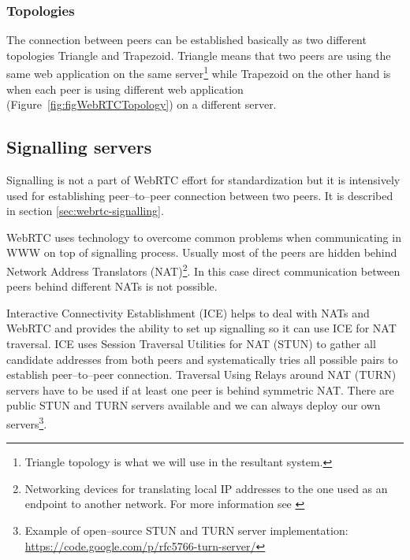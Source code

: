 \subsubsection{Topologies}
The connection between peers can be established basically as two different topologies Triangle and Trapezoid. Triangle means that two peers are using the same web application on the same server\footnote{Triangle topology is what we will use in the resultant system.} while Trapezoid on the other hand is when each peer is using different web application (Figure~\ref{fig:figWebRTCTopology}) on a different server.



\subsection{Signalling servers}
Signalling is not a part of WebRTC effort for standardization but it is intensively used for establishing peer--to--peer connection between two peers. It is described in section \ref{sec:webrtc-signalling}.

WebRTC uses technology to overcome common problems when communicating in WWW on top of signalling process. Usually most of the peers are hidden behind Network Address Translators (NAT)\footnote{Networking devices for translating local IP addresses to the one used as an endpoint to another network. For more information see \cite{rfc3022}}. In this case direct communication between peers behind different NATs is not possible.


Interactive Connectivity Establishment (ICE) helps to deal with NATs and WebRTC and provides the ability to set up signalling so it can use ICE for NAT traversal. ICE uses Session Traversal Utilities for NAT (STUN) to gather all candidate addresses from both peers and systematically tries all possible pairs \cite{rfc5245} to establish peer--to--peer connection. Traversal Using Relays around NAT (TURN) servers have to be used if at least one peer is behind symmetric NAT. There are public STUN and TURN servers available and we can always deploy our own servers\footnote{Example of open--source STUN and TURN server implementation:\\ \url{https://code.google.com/p/rfc5766-turn-server/}}.

